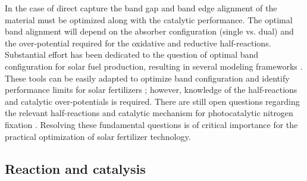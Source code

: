In the case of direct capture the band gap and band edge alignment of the material must be optimized along with the catalytic performance. The optimal band alignment will depend on the absorber configuration (single vs. dual) and the over-potential required for the oxidative and reductive half-reactions. Substantial effort has been dedicated to the question of optimal band configuration for solar fuel production, resulting in several modeling frameworks \cite{Seitz_2014, Seger_2016}. These tools can be easily adapted to optimize band configuration and identify performance limits for solar fertilizers \cite{Medford_2017}; however, knowledge of the half-reactions and catalytic over-potentials is required. There are still open questions regarding the relevant half-reactions and catalytic mechanism for photocatalytic nitrogen fixation \cite{Davies1995,Medford_2017,Comer_2018,Comer_JACS}. Resolving these fundamental questions is of critical importance for the practical optimization of solar fertilizer technology.

\subsection{Reaction and catalysis}
\label{sec:reaction}


